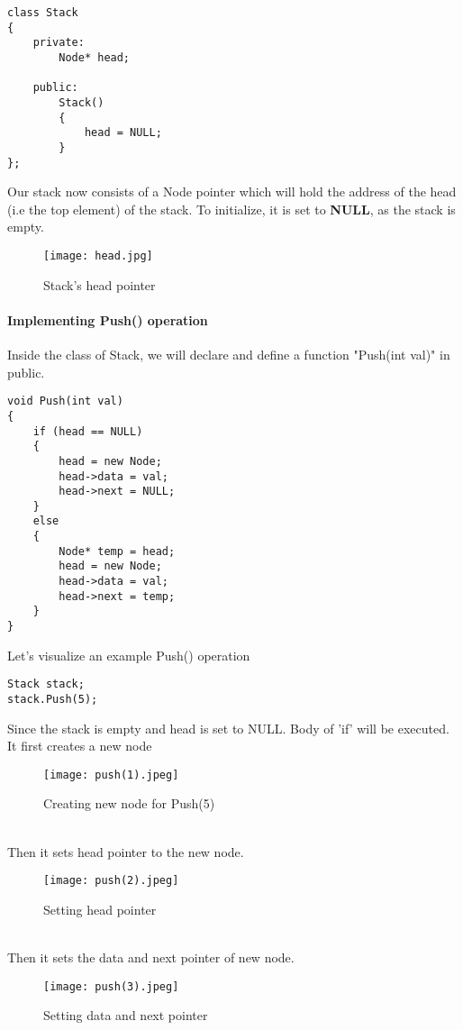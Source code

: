 \documentclass[11pt,fleqn]{book} %
\begin{document}
\begin{lstlisting}
class Stack
{
	private:
		Node* head;
		
	public:
		Stack()
		{
			head = NULL;
		}
};		

\end{lstlisting}
Our stack now consists of a Node pointer which will hold the address of the head (i.e the top element) of the stack. To initialize, it is set to \textbf{NULL}, as the stack is empty.
\begin{figure}[H]
	\centering
	\texttt{[image: head.jpg]}
	\caption{Stack's head pointer}
\end{figure}

\paragraph{Implementing Push() operation}
Inside the class of Stack, we will declare and define a function "Push(int val)" in public.
\begin{lstlisting}
void Push(int val)
{
	if (head == NULL)
	{
		head = new Node;
		head->data = val;
		head->next = NULL;
	}
	else
	{
		Node* temp = head;
		head = new Node;
		head->data = val;
		head->next = temp;
	}
}
\end{lstlisting}
\newpage
\begin{example}
Let's visualize an example Push() operation\\
\begin{lstlisting}
Stack stack;
stack.Push(5);
\end{lstlisting}
Since the stack is empty and head is set to NULL. Body of 'if' will be executed.\\
It first creates a new node\\
\begin{figure}[H]
	\centering
	\texttt{[image: push(1).jpeg]}
	\caption{Creating new node for Push(5)}
\end{figure}
~\\
Then it sets head pointer to the new node.
\begin{figure}[H]
	\centering
	\texttt{[image: push(2).jpeg]}
	\caption{Setting head pointer}
\end{figure}
~\\
Then it sets the data and next pointer of new node.
\begin{figure}[H]
	\centering
	\texttt{[image: push(3).jpeg]}
	\caption{Setting data and next pointer}
\end{figure}
\end{example}
\end{document}

